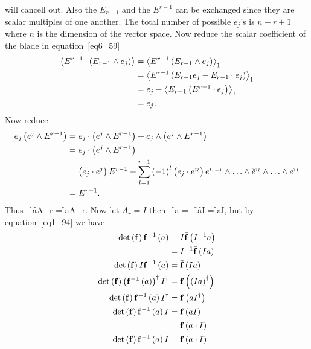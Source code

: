 will cancell out.  Also the $E_{r-1}$ and the $E^{r-1}$ can be exchanged since they are scalar multiples of one another.  The total number of possible $e_{j}$'s is 
$n-r+1$ where $n$ is the dimension of the vector space. Now reduce the scalar coefficient of the blade in equation~\ref{eq6_59}
\begin{align}
	\left ( {E^{r-1}\cdot\left ( {E_{r-1}\wedge e_{j}} \right )} \right ) &= \left \langle {E^{r-1}\left ({E_{r-1}\wedge e_{j}} \right )} \right \rangle_{1} \nonumber \\
	                                            &= \left \langle {E^{r-1}\left ({E_{r-1}e_{j}-E_{r-1}\cdot e_{j}} \right )} \right \rangle_{1} \nonumber \\
	                                            &= e_{j}-\left \langle {E_{r-1}\left ({E^{r-1}\cdot e_{j}} \right )} \right \rangle_{1} \nonumber \\
	                                            &= e_{j}.
\end{align}
Now reduce
\begin{align}
	e_{j}\paren{e^{j}\W E^{r-1}} &= e_{j}\cdot\paren{e^{j}\W E^{r-1}}+e_{j}\W\paren{e^{j}\W E^{r-1}} \nonumber \\
	                             &= e_{j}\cdot\paren{e^{j}\W E^{r-1}} \nonumber \\
	                             &= \paren{e_{j}\cdot e^{j}}E^{r-1}
	                                +\sum_{l=1}^{r-1}\onep{l}\paren{e_{j}\cdot e^{i_{l}}}e^{i_{r-1}}\W\dots\W\breve{e}^{i_{l}}\W\dots\W e^{i_{1}}  \nonumber \\
	                             &= E^{r-1}.
\end{align}
Thus
\be
	\partial_{\f{\fbld}{a}}\f{\fbld}{A_{r}} = \f{\fbld}{a\cdot A_{r}}.
\ee
Now let $A_{r}=I$ then
\be
	\partial_{\f{\fbld}{a}} = \partial_{\f{\fbld}{a}}\f{\det}{\fbld}I = \f{\fbld}{a\cdot I},
\ee
but by equation~\ref{eq1_94} we have
\begin{align}
	{\det}\left ( {\mathbf{f}} \right ){\mathbf{f}^{-1}}\left ( {a} \right ) &= I{\bar{\mathbf{f}}}\left ( {I^{-1}a} \right ) \nonumber \\
	                                     &= I^{-1}{\bar{\mathbf{f}}}\left ( {Ia} \right ) \nonumber \\
	{\det}\left ( {\mathbf{f}} \right ) I{\mathbf{f}^{-1}}\left ( {a} \right ) &= {\bar{\mathbf{f}}}\left ( {Ia} \right ) \nonumber \\
	{\det}\left ( {\mathbf{f}} \right )\left ( {{\mathbf{f}^{-1}}\left ( {a} \right )} \right )^{\dagger}I^{\dagger} &= {\bar{\mathbf{f}}}\left ( {\left ( {Ia} \right )^{\dagger}} \right ) \nonumber \\
	{\det}\left ( {\mathbf{f}} \right ){\mathbf{f}^{-1}}\left ( {a} \right ) I^{\dagger} &= {\bar{\mathbf{f}}}\left ( {aI^{\dagger}} \right ) \nonumber \\
	{\det}\left ( {\mathbf{f}} \right ){\mathbf{f}^{-1}}\left ( {a} \right ) I &= {\bar{\mathbf{f}}}\left ( {aI} \right ) \nonumber \\
	                                  &= {\bar{\mathbf{f}}}\left ( {a\cdot I} \right ) \nonumber \\
	{\det}\left ( {\mathbf{f}} \right ){\bar{\mathbf{f}}^{-1}}\left ( {a} \right ) I &= {\mathbf{f}}\left ( {a\cdot I} \right )                                  
\end{align}
